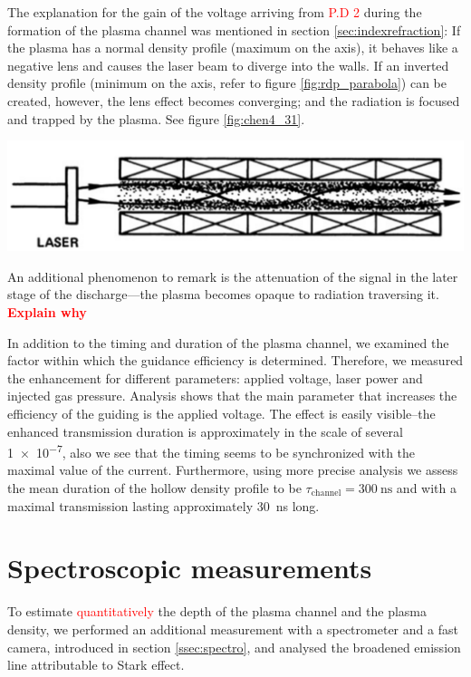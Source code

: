 \documentclass[justified,nofonts,nobib,openany]{tufte-book}
\begin{document}
The explanation for the gain of the voltage arriving from \textcolor{red}{P.D 2} during the formation of the plasma channel was mentioned in section \ref{sec:indexrefraction}: If the plasma has a normal density profile (maximum on the axis), it behaves like a negative lens and causes the laser beam to diverge into the walls. If an inverted density profile (minimum on the axis, refer to figure \ref{fig:rdp_parabola}) can be created, however, the lens effect becomes converging; and the radiation is focused and trapped by the plasma. See figure \ref{fig:chen4_31}.
\begin{marginfigure}
		\includegraphics[width=\marginparwidth]{./figures/chen4_31.PNG}
		\caption{A plasma confined inside the capillary will trap the \SI{800}{\nm} laser light only if the plasma has a density minimum on axis.}
		\label{fig:chen4_31}
\end{marginfigure}

An additional phenomenon to remark is the attenuation of the signal in the later stage of the discharge---the plasma becomes opaque to radiation traversing it. \textcolor{red}{\textbf{Explain why}}

In addition to the timing and duration of the plasma channel, we examined the factor within which the guidance efficiency is determined. Therefore, we measured the enhancement for different parameters: applied voltage, laser power and injected gas pressure. Analysis shows that the main parameter that increases the efficiency of the guiding is the applied voltage. The effect is easily visible--the enhanced transmission duration is approximately in the scale of several \SI{1e-7}{\sec}, also we see that the timing seems to be synchronized with the maximal value of the current. Furthermore, using more precise analysis we assess the mean duration of the hollow density profile to be $\tau_\text{channel}=\SI{300}{\ns}$ and with a maximal transmission lasting approximately \SI{30}{\ns} long.

\section{Spectroscopic measurements}\label{sec:spectro}
To estimate \textcolor{red}{quantitatively} the depth of the plasma channel and the plasma density, we performed an additional measurement with a spectrometer and a fast camera, introduced in section \ref{ssec:spectro}, and analysed the broadened emission line attributable to Stark effect.
\end{document}
